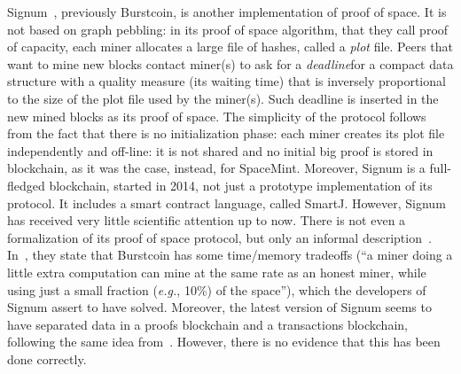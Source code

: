 Signum~\cite{Signum}, previously Burstcoin, is another implementation of proof of space.
It is not based on graph pebbling: in its proof of space algorithm, that they
call proof of capacity, each miner allocates a large file of hashes, called a
\emph{plot} file. Peers that want to mine new blocks contact miner(s) to ask for a
\emph{deadline}\ie for a compact data structure with a quality measure (its waiting time) that
is inversely proportional to the size of the plot file used by the miner(s). Such deadline is
inserted in the new mined blocks as its proof of space. The simplicity of the protocol
follows from the fact that there is no initialization phase: each miner creates its plot file
independently and off-line: it is not shared and no initial big proof is stored in
blockchain, as it was the case, instead, for SpaceMint. Moreover, Signum is a full-fledged blockchain,
started in 2014, not just a prototype implementation of its protocol. It includes a smart
contract language, called SmartJ. However, Signum has received very little scientific
attention up to now. There is not even a formalization of its proof of space protocol,
but only an informal description~\cite{SignumPlotting}.
In~\cite{ParkKFGAP18}, they state that Burstcoin has some
time/memory tradeoffs (``a miner doing a little extra computation can mine at the same
rate as an honest miner, while using just a small fraction (\emph{e.g.}, 10\%) of the space''),
which the developers of Signum assert to have solved. Moreover, the latest version of Signum
seems to have separated data in a proofs blockchain and a transactions blockchain,
following the same idea from~\cite{ParkKFGAP18}. However, there is no evidence that this has been done
correctly.
